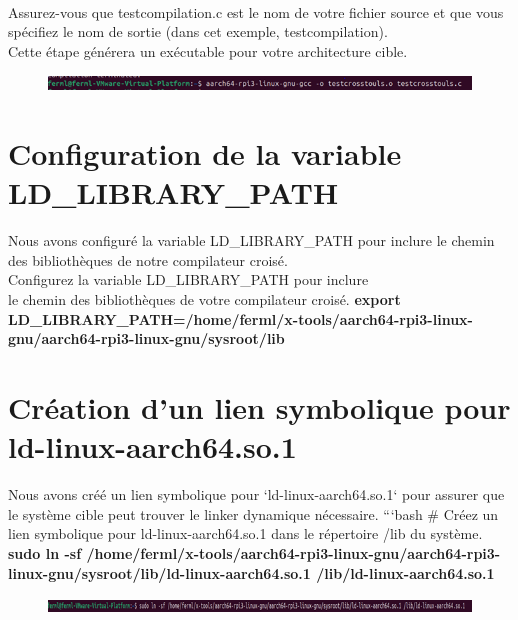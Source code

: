 \\Assurez-vous que testcompilation.c est le nom de votre fichier source et que vous spécifiez le nom de sortie (dans cet exemple, testcompilation).
\\Cette étape générera un exécutable pour votre architecture cible. 
\begin{figure}[h]
    \includegraphics[width=1\textwidth]{images/20.png}   
\end{figure}

\section{Configuration de la variable LD\_LIBRARY\_PATH }
Nous avons configuré la variable LD\_LIBRARY\_PATH pour inclure le chemin des bibliothèques de notre compilateur croisé.
\\Configurez la variable LD\_LIBRARY\_PATH pour inclure 
\\le chemin des bibliothèques de votre compilateur croisé. 
\textbf{export LD\_LIBRARY\_PATH=/home/ferml/x-tools/aarch64-rpi3-linux-gnu/aarch64-rpi3-linux-gnu/sysroot/lib}


\section{Création d'un lien symbolique pour ld-linux-aarch64.so.1}
 Nous avons créé un lien symbolique pour `ld-linux-aarch64.so.1` pour assurer que le système cible peut trouver le linker dynamique nécessaire. ```bash # Créez un lien symbolique pour ld-linux-aarch64.so.1 dans le répertoire /lib du système. 
 \textbf{sudo ln -sf /home/ferml/x-tools/aarch64-rpi3-linux-gnu/aarch64-rpi3-linux-gnu/sysroot/lib/ld-linux-aarch64.so.1 /lib/ld-linux-aarch64.so.1 }
 \begin{figure}[h]
    \includegraphics[width=1\textwidth]{images/21.png}   
\end{figure}
